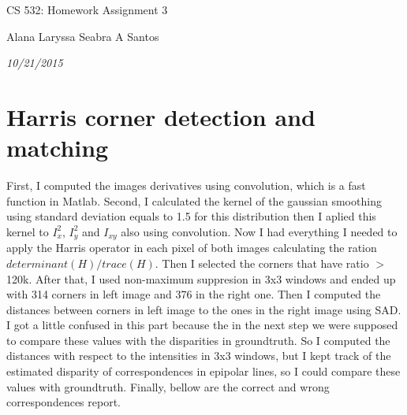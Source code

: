 \documentclass{article}
\begin{document}
\centerline{\sc \large CS 532: Homework Assignment 3}
\vspace{.5pc}
\centerline{Alana Laryssa Seabra A Santos}
\centerline{\it 10/21/2015}
\vspace{1pc}

\section{Harris corner detection and matching}
First, I computed the images derivatives using convolution, which is a fast function in Matlab. Second, I calculated the kernel of the gaussian smoothing using standard deviation equals to 1.5 for this distribution then I aplied this kernel to $I_x^2$, $I_y^2$ and $I_{xy}$ also using convolution. Now I had everything I needed to apply the Harris operator in each pixel of both images calculating the ration $determinant(H)/trace(H)$. Then I selected the corners that have ratio $>$ 120k. After that, I used non-maximum suppresion in 3x3 windows and ended up with 314 corners in left image and 376 in the right one. Then I computed the distances between corners in left image to the ones in the right image using SAD. I got a little confused in this part because the in the next step we were supposed to compare these values with the disparities in groundtruth. So I computed the distances with respect to the intensities in 3x3 windows, but I kept track of the estimated disparity of correspondences in epipolar lines, so I could compare these values with groundtruth. Finally, bellow are the correct and wrong correspondences report.
\end{document}
